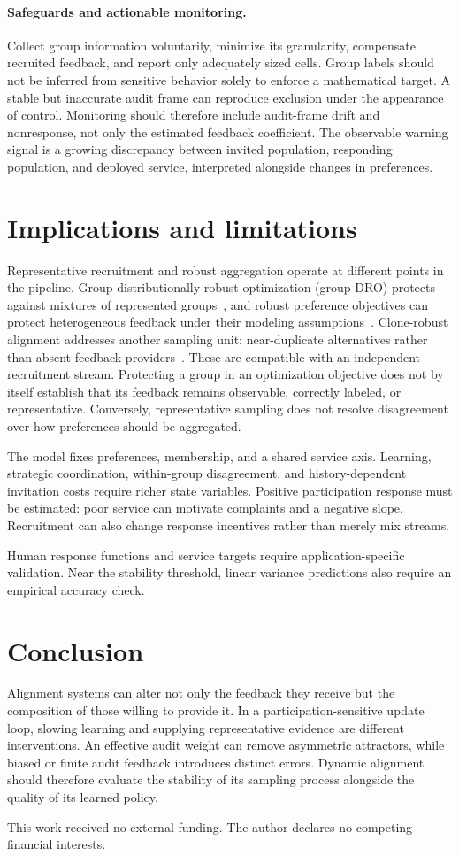 \documentclass{article}
\begin{document}
\paragraph{Safeguards and actionable monitoring.}
Collect group information voluntarily, minimize its granularity, compensate recruited feedback, and report only adequately sized cells. Group labels should not be inferred from sensitive behavior solely to enforce a mathematical target. A stable but inaccurate audit frame can reproduce exclusion under the appearance of control. Monitoring should therefore include audit-frame drift and nonresponse, not only the estimated feedback coefficient. The observable warning signal is a growing discrepancy between invited population, responding population, and deployed service, interpreted alongside changes in preferences.

\section{Implications and limitations}
Representative recruitment and robust aggregation operate at different points in the pipeline. Group distributionally robust optimization (group DRO) protects against mixtures of represented groups~\citep{sagawa2020}, and robust preference objectives can protect heterogeneous feedback under their modeling assumptions~\citep{ramesh2024,chakraborty2024}. Clone-robust alignment addresses another sampling unit: near-duplicate alternatives rather than absent feedback providers~\citep{procaccia2025}. These are compatible with an independent recruitment stream. Protecting a group in an optimization objective does not by itself establish that its feedback remains observable, correctly labeled, or representative. Conversely, representative sampling does not resolve disagreement over how preferences should be aggregated.

The model fixes preferences, membership, and a shared service axis. Learning, strategic coordination, within-group disagreement, and history-dependent invitation costs require richer state variables. Positive participation response must be estimated: poor service can motivate complaints and a negative slope. Recruitment can also change response incentives rather than merely mix streams.

Human response functions and service targets require application-specific validation. Near the stability threshold, linear variance predictions also require an empirical accuracy check.

\section{Conclusion}
Alignment systems can alter not only the feedback they receive but the composition of those willing to provide it. In a participation-sensitive update loop, slowing learning and supplying representative evidence are different interventions. An effective audit weight can remove asymmetric attractors, while biased or finite audit feedback introduces distinct errors. Dynamic alignment should therefore evaluate the stability of its sampling process alongside the quality of its learned policy.

\clearpage
\begin{ack}
This work received no external funding. The author declares no competing financial interests.
\end{ack}


\clearpage
\appendix

\end{document}
